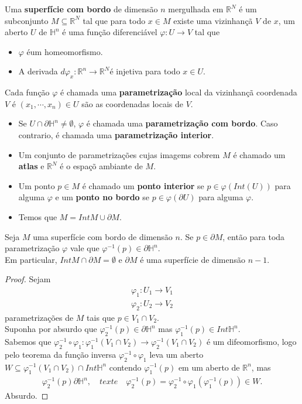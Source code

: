 \begin{definition}
  Uma \textbf{superfície com bordo} de dimensão $n$ mergulhada em $\mathbb{R}^{N}$ é um subconjunto $M\subseteq \mathbb{R}^{N}$ tal que para todo $x\in M$ existe uma vizinhançã $V$ de $x$, um aberto $U$ de $\mathbb{H}^{n}$ é uma função diferenciável $\varphi:U\to V$ tal que
  \begin{itemize}
    \item $\varphi$ éum homeomorfismo.
    \item A derivada $d\varphi_x:\mathbb{R}^{n}\to\mathbb{R}^{N}$é injetiva para todo $x\in U$.
  \end{itemize}
  Cada função $\varphi$ é chamada uma \textbf{parametrização} local da vizinhançã coordenada $V$ é \newline $(x_1,\cdots,x_n)\in U$ são as coordenadas locais de $V$.
  \begin{itemize}
    \item Se $U\cap\partial\mathbb{H}^{n}\neq \emptyset$, $\varphi$ é chamada uma \textbf{parametrização com bordo}. Caso contrario, é chamada uma \textbf{parametrização interior}.
    \item Um conjunto de parametrizações cujas imagems cobrem $M$ é chamado um \textbf{atlas} e $\mathbb{R}^{N}$ é o espaçõ ambiante de $M$.
    \item Um ponto $p\in M$ é chamado um \textbf{ponto interior} se $p\in\varphi(Int(U))$ para alguma $\varphi$ e um \textbf{ponto no bordo} se $p\in\varphi(\partial U)$ para alguma $\varphi$.
    \item Temos que $M=Int M\cup\partial M$.
  \end{itemize}
\end{definition}
\begin{proposition}
  Seja $M$ uma superfície com bordo de dimensão $n$. Se $p\in\partial M$, então para toda parametrização $\varphi$ vale que $\varphi^{-1}(p)\in\partial\mathbb{H}^{n}$.\\
  Em particular, $Int M\cap\partial M=\emptyset$ e $\partial M$ é uma superfície de dimensão $n-1$. 
\end{proposition}
\begin{proof} 
  Sejam
  \begin{align*}
    \varphi_1:U_1\to V_1\\
    \varphi_2:U_2\to V_2
  \end{align*}
  parametrizações de $M$ tais que $p\in V_1\cap V_2$.\\
  Suponha por absurdo que $\varphi^{-1}_2(p)\in\partial \mathbb{H}^{n}$ mas $\varphi^{-1}_1(p)\in Int \mathbb{H}^{n}$.\\
  Sabemos que $\varphi_2^{-1}\circ\varphi_1:\varphi_1^{-1}(V_1\cap V_2)\to\varphi^{-1}_2(V_1\cap V_2)$ é um difeomorfismo, logo pelo teorema da função inversa $\varphi^{-1}_2\circ\varphi_1$ leva um aberto $W\subseteq \varphi_1^{-1}(V_1\cap V_2)\cap Int\mathbb{H}^{n}$ contendo $\varphi^{-1}_1(p)$ em um aberto de $\mathbb{R}^{n}$, mas
  \begin{align*}
    \varphi^{-1}_2(p)\partial\mathbb{H}^{n},\quad text{e}\quad \varphi_2^{-1}(p)=\varphi_2^{-1}\circ\varphi_1(\varphi_1^{-1}(p))\in W.
  \end{align*}
  Absurdo.
\end{proof}
